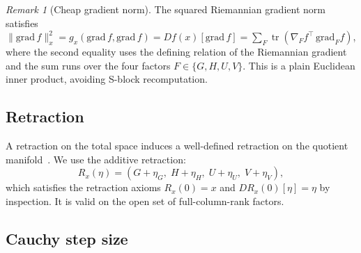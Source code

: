 \documentclass[letterpaper, 10 pt, conference]{ieeeconf}
\newcommand{\tr}{\operatorname{tr}}
\theoremstyle{plain}
\theoremstyle{definition}
\theoremstyle{remark}
\newtheorem{remark}{Remark}
\begin{document}
\begin{remark}[Cheap gradient norm]\label{rem:cheap_norm}
The squared Riemannian gradient norm satisfies
$\|\mathrm{grad}\,f\|_x^2 = g_x(\mathrm{grad}\,f,\mathrm{grad}\,f) = Df(x)[\mathrm{grad}\,f] = \sum_F \tr(\nabla_F f^\top\,\mathrm{grad}_F f)$,
where the second equality uses the defining relation of the Riemannian gradient and the sum runs over the four factors $F\in\{G,H,U,V\}$.
This is a plain Euclidean inner product, avoiding S-block recomputation.
\end{remark}

\subsection{Retraction}
A retraction on the total space induces a well-defined retraction on the quotient manifold~\cite[Prop.~4.1.3]{absilbook}.
We use the additive retraction:
\begin{equation}
  R_x(\eta) = (G{+}\eta_G,\; H{+}\eta_H,\; U{+}\eta_U,\; V{+}\eta_V),
  \label{eq:retraction}
\end{equation}
which satisfies the retraction axioms $R_x(0) = x$ and $DR_x(0)[\eta] = \eta$ by inspection.
It is valid on the open set of full-column-rank factors.


\subsection{Cauchy step size}
\label{sec:cauchy}
\end{document}
